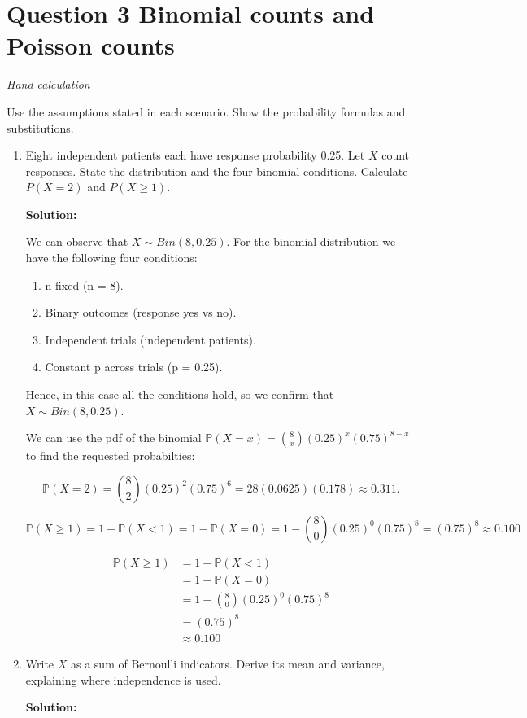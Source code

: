 \documentclass[11pt]{article}
\newcommand{\solution}{\par\medskip\noindent\textbf{Solution:}\par\vspace{0cm}}
\begin{document}
\newpage
\section*{Question 3 \quad Binomial counts and Poisson counts}
\textit{Hand calculation}

Use the assumptions stated in each scenario. Show the probability formulas and substitutions.

\begin{enumerate}[label=\textbf{(\alph*)}]
  \item Eight independent patients each have response probability 0.25. Let $X$ count responses. State the distribution and the four binomial conditions. Calculate $P(X = 2)$ and $P(X \geq 1)$.
  \solution

  We can observe that $X \sim Bin(8, 0.25)$. For the binomial distribution we have the following four conditions:

  \begin{enumerate}
    \item n fixed (n = 8).
    \item Binary outcomes (response yes vs no).
    \item Independent trials (independent patients).
    \item Constant p across trials (p = 0.25).
  \end{enumerate}

  Hence, in this case all the conditions hold, so we confirm that $X \sim Bin(8, 0.25)$.

  We can use the pdf of the binomial $ \mathbb{P}(X = x) = \binom{8}{x}(0.25)^x(0.75)^{8-x}$ to find the requested probabilties:


  \[
  \mathbb{P}(X = 2) = \binom{8}{2}(0.25)^2(0.75)^{6} = 28(0.0625)(0.178) \approx 0.311.
  \]

  \[
  \mathbb{P}(X \geq 1) = 1 - \mathbb{P}(X < 1) = 1 - \mathbb{P}(X = 0) = 1 - \binom{8}{0}(0.25)^0(0.75)^{8} = (0.75)^{8} \approx 0.100
  \]

  \begin{align*}
    \mathbb{P}(X \geq 1) &= 1 - \mathbb{P}(X < 1) \\
    &= 1 - \mathbb{P}(X = 0) \\
    &= 1 - \binom{8}{0}(0.25)^0(0.75)^{8} \\
    &= (0.75)^{8} \\ 
    &\approx 0.100
  \end{align*}
  \item Write $X$ as a sum of Bernoulli indicators. Derive its mean and variance, explaining where independence is used.
  \solution


\end{enumerate}
\end{document}
